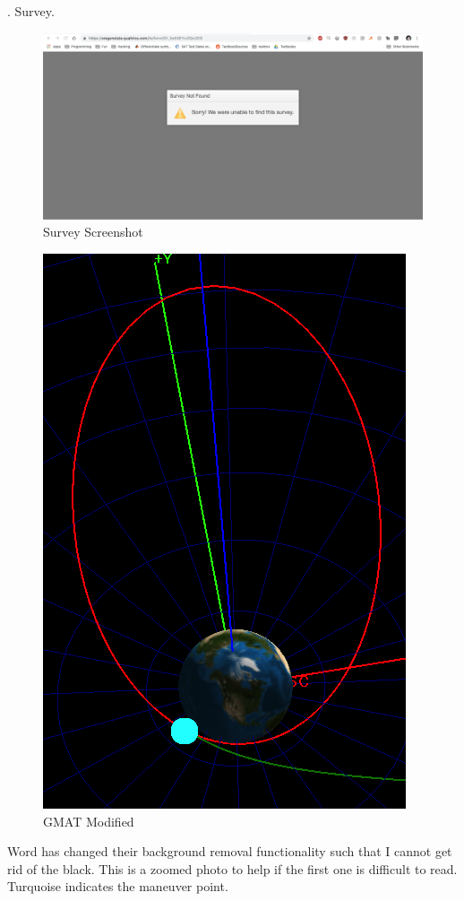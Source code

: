 \documentclass[hidelinks,12pt]{article}
\begin{document}
. Survey.\\
\begin{figure}[!htb]
  \center
  \includegraphics[scale=0.3]{survey}
  \caption{Survey Screenshot}
  \label{fig:temp}
\end{figure}
\newpage

\newpage
\begin{figure}[!htb]
  \center
  \includegraphics[scale=0.9]{GMAT2}
  \caption{GMAT Modified}
  \label{fig:temp}
\end{figure}
Word has changed their background removal functionality such that I cannot get rid of the black. This is a zoomed photo to help if the first one is difficult to read. Turquoise indicates the maneuver point.
\end{document}

